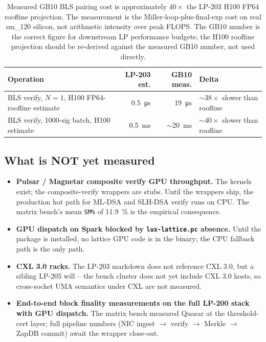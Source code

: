 \begin{table}[h]
\centering
\small
\begin{tabular}{@{}p{4.4cm}rrp{2.6cm}@{}}
\toprule
\textbf{Operation} & \textbf{LP-203 est.}
  & \textbf{GB10 meas.} & \textbf{Delta} \\
\midrule
BLS verify, $N{=}1$, H100 FP64-roofline
  estimate & \SI{0.5}{\micro\second}
  & \SI{19}{\micro\second}
  & $\sim 38\times$ slower than roofline \\
BLS verify, 1000-sig batch, H100 estimate
  & \SI{0.5}{\milli\second}
  & $\sim$\SI{20}{\milli\second}
  & $\sim 40\times$ slower than roofline \\
\bottomrule
\end{tabular}
\caption{Measured GB10 BLS pairing cost is approximately
$40\times$ the LP-203 H100 FP64 roofline projection. The
measurement is the Miller-loop-plus-final-exp cost on real
sm\_120 silicon, not arithmetic intensity over peak FLOPS. The
GB10 number is the correct figure for downstream LP
performance budgets; the H100 roofline projection should be
re-derived against the measured GB10 number, not used directly.}
\label{tab:projection-delta}
\end{table}

\subsection{What is NOT yet measured}

\begin{itemize}[leftmargin=2em,nosep]
\item \textbf{Pulsar / Magnetar composite verify GPU
  throughput.} The kernels exist; the composite-verify wrappers
  are stubs. Until the wrappers ship, the production hot path
  for ML-DSA and SLH-DSA verify runs on CPU. The matrix bench's
  mean \texttt{SM\%} of \SI{11.9}{\percent} is the empirical
  consequence.
\item \textbf{GPU dispatch on Spark blocked by
  \texttt{lux-lattice.pc} absence.} Until the package is
  installed, no lattice GPU code is in the binary; the CPU
  fallback path is the only path.
\item \textbf{CXL 3.0 racks.} The LP-203 markdown does not
  reference CXL 3.0, but a sibling LP-205 will -- the bench
  cluster does not yet include CXL 3.0 hosts, so cross-socket
  UMA semantics under CXL are not measured.
\item \textbf{End-to-end block finality measurements on the
  full LP-200 stack with GPU dispatch.} The matrix bench
  measured Quasar at the threshold-cert layer; full pipeline
  numbers (NIC ingest $\to$ verify $\to$ Merkle $\to$ ZapDB
  commit) await the wrapper close-out.
\end{itemize}

